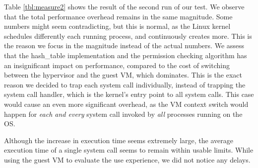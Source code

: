 \par Table \ref{tbl:measure2} shows the result of the second run of our test. We observe that the total performance overhead remains in the same magnitude. Some numbers might seem contradicting, but this is normal, as the Linux kernel schedules differently each running process, and continuously creates more. This is the reason we focus in the magnitude instead of the actual numbers. We assess that the hash\_table implementation and the permission checking algorithm has an insignificant impact on performance, compared to the cost of switching between the hypervisor and the guest \ac{VM}, which dominates. This is the exact reason we decided to trap each system call individually, instead of trapping the system call handler, which is the kernel's entry point to all system calls. This case would cause an even more significant overhead, as the \ac{VM} context switch would happen for \emph{each and every} system call invoked by \emph{all} processes running on the \ac{OS}.

\par Although the increase in execution time seems extremely large, the average execution time of a single system call seems to remain within usable limits. While using the guest \ac{VM} to evaluate the use experience, we did not notice any delays. 


